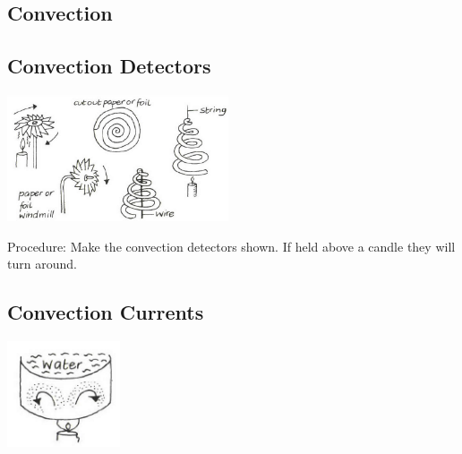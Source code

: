 \begin{multicols}{2}

\section*{Convection}


\subsection{Convection Detectors}

\begin{center}
\includegraphics[width=0.49\textwidth]{./img/vso/convection-detectors.png}
\end{center}

\begin{description*}
\item[Procedure:]{Make the convection detectors shown. If held above a candle they will turn around.}
\end{description*}


\subsection{Convection Currents}

\begin{center}
\includegraphics[width=0.25\textwidth]{./img/vso/convection-currents.png}
\end{center}


\end{multicols}

